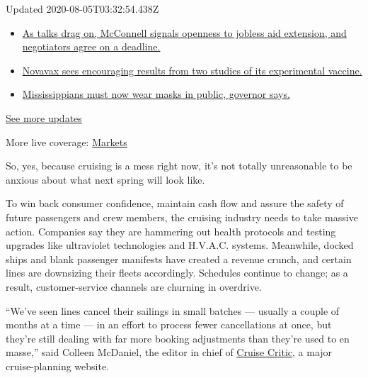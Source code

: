 Updated 2020-08-05T03:32:54.438Z

\begin{itemize}
\tightlist
\item
  \href{https://www.nytimes.com/2020/08/04/world/coronavirus-cases.html?action=click\&pgtype=Article\&state=default\&region=MAIN_CONTENT_1\&context=storylines_live_updates\#link-762df92}{As
  talks drag on, McConnell signals openness to jobless aid extension,
  and negotiators agree on a deadline.}
\item
  \href{https://www.nytimes.com/2020/08/04/world/coronavirus-cases.html?action=click\&pgtype=Article\&state=default\&region=MAIN_CONTENT_1\&context=storylines_live_updates\#link-1228a480}{Novavax
  sees encouraging results from two studies of its experimental
  vaccine.}
\item
  \href{https://www.nytimes.com/2020/08/04/world/coronavirus-cases.html?action=click\&pgtype=Article\&state=default\&region=MAIN_CONTENT_1\&context=storylines_live_updates\#link-794484ed}{Mississippians
  must now wear masks in public, governor says.}
\end{itemize}

\href{https://www.nytimes.com/2020/08/04/world/coronavirus-cases.html?action=click\&pgtype=Article\&state=default\&region=MAIN_CONTENT_1\&context=storylines_live_updates}{See
more updates}

More live coverage:
\href{https://www.nytimes.com/live/2020/08/04/business/stock-market-today-coronavirus?action=click\&pgtype=Article\&state=default\&region=MAIN_CONTENT_1\&context=storylines_live_updates}{Markets}

So, yes, because cruising is a mess right now, it's not totally
unreasonable to be anxious about what next spring will look like.

To win back consumer confidence, maintain cash flow and assure the
safety of future passengers and crew members, the cruising industry
needs to take massive action. Companies say they are hammering out
health protocols and testing upgrades like ultraviolet technologies and
H.V.A.C. systems. Meanwhile, docked ships and blank passenger manifests
have created a revenue crunch, and certain lines are downsizing their
fleets accordingly. Schedules continue to change; as a result,
customer-service channels are churning in overdrive.

``We've seen lines cancel their sailings in small batches --- usually a
couple of months at a time --- in an effort to process fewer
cancellations at once, but they're still dealing with far more booking
adjustments than they're used to en masse,'' said Colleen McDaniel, the
editor in chief of \href{https://www.cruisecritic.com/}{Cruise Critic},
a major cruise-planning website.

